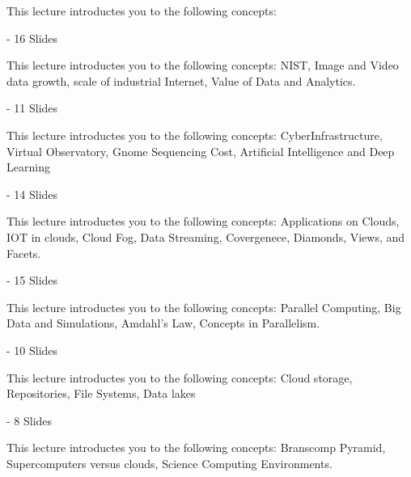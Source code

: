 This lecture introductes you to the following concepts:


 - 16 Slides

This lecture introductes you to the following concepts: NIST, Image and Video data growth,
scale of industrial Internet, Value of Data and Analytics. 

 - 11 Slides

This lecture introductes you to the following concepts: CyberInfrastructure, 
Virtual Observatory, Gnome Sequencing Cost, Artificial Intelligence and Deep 
Learning

 - 14 Slides

This lecture introductes you to the following concepts: Applications on Clouds,
IOT in clouds, Cloud Fog, Data Streaming, Covergenece, Diamonds, Views, and Facets.

 - 15 Slides

This lecture introductes you to the following concepts: Parallel Computing, 
Big Data and Simulations, Amdahl's Law, Concepts in Parallelism. 

 - 10 Slides

This lecture introductes you to the following concepts: Cloud storage, 
Repositories, File Systems, Data lakes

 - 8 Slides

This lecture introductes you to the following concepts: Branscomp Pyramid, 
Supercomputers versus clouds, Science Computing Environments. 


